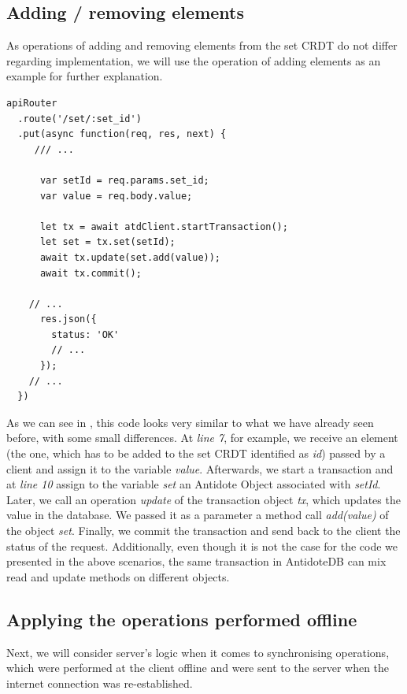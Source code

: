 \subsection*{Adding / removing elements}

As operations of adding and removing elements from the set CRDT do not differ regarding implementation, we will use the operation of adding elements as an example for further explanation.

\begin{lstlisting}[caption={Code for applying an \textit{add} operation to a set CRDT.}, label={lst:dev2}]
apiRouter
  .route('/set/:set_id')
  .put(async function(req, res, next) {
     /// ...

      var setId = req.params.set_id;
      var value = req.body.value;      

      let tx = await atdClient.startTransaction();
      let set = tx.set(setId);
      await tx.update(set.add(value));
      await tx.commit();

    // ...
      res.json({
        status: 'OK'
        // ...
      });
    // ...
  })
\end{lstlisting} 

As we can see in , this code looks very similar to what we have already seen before, with some small differences. At \textit{line 7}, for example, we receive an element (the one, which has to be added to the set CRDT identified as \textit{id}) passed by a client and assign it to the variable \textit{value}. Afterwards, we start a transaction and at \textit{line 10} assign to the variable \textit{set} an Antidote Object associated with \textit{setId}. Later, we call an operation \textit{update} of the transaction object \textit{tx}, which updates the value in the database. We passed it as a parameter a method call \textit{add(value)} of the object \textit{set}. Finally, we commit the transaction and send back to the client the status of the request. Additionally, even though it is not the case for the code we presented in the above scenarios, the same transaction in AntidoteDB can mix read and update methods on different objects.

\subsection*{Applying the operations performed offline}

Next, we will consider server's logic when it comes to synchronising operations, which were performed at the client offline and were sent to the server when the internet connection was re-established.


